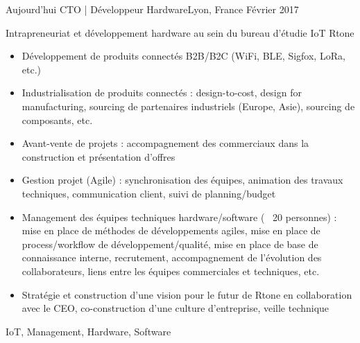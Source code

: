 %
%
%

\begin{experiences}
  \experience
    {Aujourd'hui}   {CTO | Développeur Hardware}{}{Lyon, France}
    {Février 2017} {
                      Intrapreneuriat et développement hardware au sein du bureau d'étudie IoT Rtone
                      \begin{itemize}
                        \item Développement de produits connectés B2B/B2C (WiFi, BLE, Sigfox, LoRa, etc.)
                        \item Industrialisation de produits connectés : design-to-cost, design for manufacturing, sourcing de partenaires industriels (Europe, Asie), sourcing de composants, etc.
                        \item Avant-vente de projets : accompagnement des commerciaux dans la construction et présentation d'offres
                        \item Gestion projet (Agile) : synchronisation des équipes, animation des travaux techniques, communication client, suivi de planning/budget
                        \item Management des équipes techniques hardware/software (~ 20 personnes) : mise en place de méthodes de développements agiles, mise en place de process/workflow de développement/qualité, mise en place de base de connaissance interne, recrutement, accompagnement de l'évolution des collaborateurs, liens entre les équipes commerciales et techniques, etc.
                        \item Stratégie et construction d'une vision pour le futur de Rtone en collaboration avec le CEO, co-construction d'une culture d'entreprise, veille technique
                      \end{itemize}
                    }
                    {IoT, Management, Hardware, Software}
                    
  \emptySeparator


\end{experiences}
